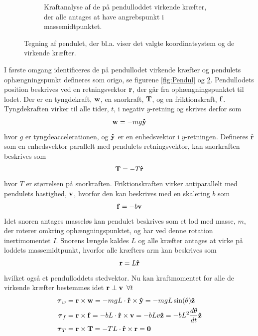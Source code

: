 \begin{figure}[]
\begin{subfigure}{.45\textwidth}
  \caption{Kraftanalyse af de på pendulloddet virkende kræfter, der alle antages at have angrebspunkt i massemidtpunktet.}
  \label{fig:Kraftanalyse}
\end{subfigure}
\caption{Tegning af pendulet, der bl.a. viser det valgte koordinatsystem og de virkende kræfter.}
\end{figure}

I første omgang identificeres de på pendullodet virkende kræfter og pendulets ophængningspunkt defineres som origo, se figurene \ref{fig:Pendul} og \ref{fig:Kraftanalyse}. Pendullodets position beskrives ved en retningsvektor $\mathbf{r}$, der går fra ophængningspunktet til lodet. Der er en tyngdekraft, $\mathbf{w}$, en snorkraft, $\mathbf{T}$, og en friktionskraft, $\mathbf{f}$. Tyngdekraften virker til alle tider, $t$, i negativ $y$-retning og skrives derfor som
\begin{align*}
\mathbf{w} = -mg\mathbf{\hat{y}}
\end{align*}
hvor $g$ er tyngdeaccelerationen, og $\mathbf{\hat{y}}$ er en enhedsvektor i $y$-retningen. Defineres $\boldsymbol{\hat{\textbf{r}}}$ som en enhedsvektor parallelt med pendulets retningsvektor, kan snorkraften beskrives som
\begin{align*}
\mathbf{T} = -T\boldsymbol{\hat{\textbf{r}}}
\end{align*}
hvor $T$ er størrelsen på snorkraften. Friktionskraften virker antiparallelt med pendulets hastighed, $\mathbf{v}$, hvorfor den kan beskrives med en skalering $b$ som
\begin{align*}
\mathbf{f} = -b\mathbf{v}
\end{align*}
Idet snoren antages masseløs kan pendulet beskrives som et lod med masse, $m$, der roterer omkring ophængningspunktet, og har ved denne rotation inertimomentet $I$. Snorens længde kaldes $L$ og alle kræfter antages at virke på loddets massemidtpunkt, hvorfor alle kræfters arm kan beskrives som
\begin{align*}
\mathbf{r} = L\boldsymbol{\hat{\textbf{r}}}
\end{align*}
hvilket også et pendulloddets stedvektor. Nu kan kraftmomentet for alle de virkende kræfter bestemmes idet $\mathbf{r}\perp\mathbf{v}\enspace\forall t$
\begin{align*}
\mbox{\boldmath$ \tau $}_w &= \mathbf{r} \times \mathbf{w} = -mgL \cdot \boldsymbol{\hat{\textbf{r}}} \times \mathbf{\hat{y}} = -mgL\sin(\theta)\mathbf{\hat{z}} \\
\mbox{\boldmath$ \tau $}_f &= \mathbf{r} \times \mathbf{f} = -bL \cdot \boldsymbol{\hat{\textbf{r}}} \times \mathbf{v} = -bLv\mathbf{\hat{z}} = -bL^2{d{\theta} \over d{t}}\mathbf{\hat{z}} \\
\mbox{\boldmath$ \tau $}_T &= \mathbf{r} \times \mathbf{T} = -TL \cdot \boldsymbol{\hat{\textbf{r}}} \times \mathbf{r} = \mathbf{0}
\end{align*}
